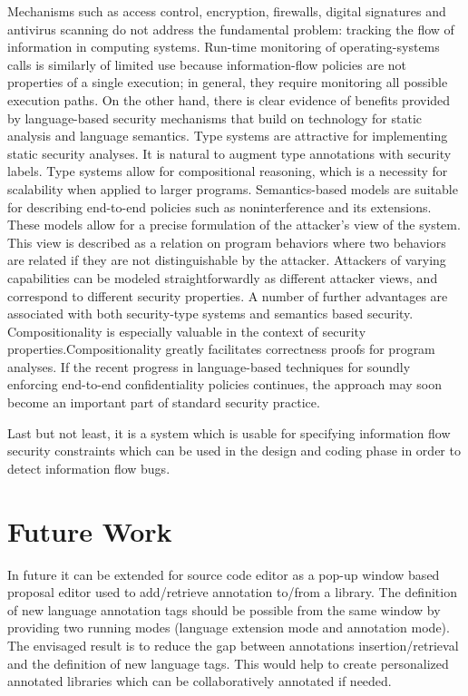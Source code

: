 Mechanisms such as access control, encryption, firewalls, digital
signatures and antivirus scanning do not address the fundamental
problem: tracking the flow of information in computing
systems. Run-time monitoring of operating-systems calls is
similarly of limited use because information-flow policies are
not properties of a single execution; in general, they require
monitoring all possible execution paths. On the other hand,
there is clear evidence of benefits provided by language-based
security mechanisms that build on technology for static analysis
and language semantics. Type systems are attractive for
implementing static security analyses. It is natural to augment
type annotations with security labels. Type systems allow for
compositional reasoning, which is a necessity for scalability
when applied to larger programs. Semantics-based models
are suitable for describing end-to-end policies such as
noninterference and its extensions. These models allow for a
precise formulation of the attacker's view of the system. This
view is described as a relation on program behaviors where
two behaviors are related if they are not distinguishable by
the attacker. Attackers of varying capabilities can be modeled
straightforwardly as different attacker views, and correspond
to different security properties. A number of further advantages are
associated with both security-type systems and semantics based
security. Compositionality is especially valuable in the
context of security properties.Compositionality
greatly facilitates correctness proofs for program analyses. If the recent
progress in language-based techniques for soundly enforcing
end-to-end confidentiality policies continues, the approach
may soon become an important part of standard security
practice.

Last but not least, it is a system which is usable for specifying information flow security constraints which can be used in the design and coding phase in order to detect information flow bugs.





\section{ Future Work}
In future it can be extended for source code editor as
a pop-up window based proposal editor used to add/retrieve
annotation to/from a library. The definition of new language
annotation tags should be possible from the same window by
providing two running modes (language extension mode and
annotation mode). The envisaged result is to reduce the gap
between annotations insertion/retrieval and the definition of
new language tags. This would help to create personalized
annotated libraries which can be collaboratively annotated if
needed.

